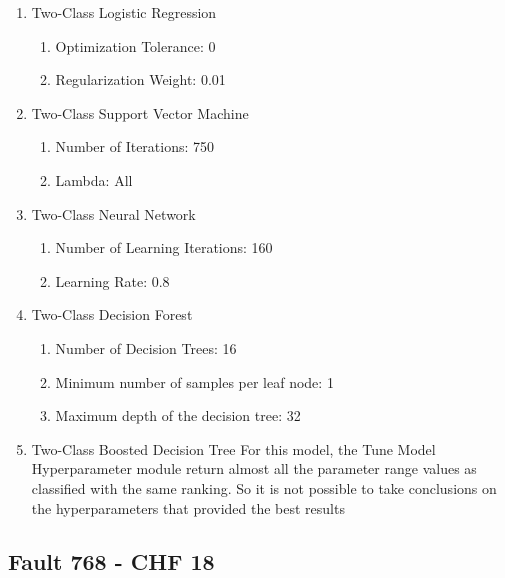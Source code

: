 \begin{enumerate}
    \item{Two-Class Logistic Regression}
    
    \begin{enumerate}
        \item{Optimization Tolerance:} 0
        \item{Regularization Weight:} 0.01
    \end{enumerate}
    
    \item{Two-Class Support Vector Machine}
    
    \begin{enumerate}
        \item{Number of Iterations:} 750
        \item{Lambda:} All
    \end{enumerate}
    
    \item{Two-Class Neural Network}
    
    \begin{enumerate}
        \item{Number of Learning Iterations:} 160
        \item{Learning Rate:} 0.8
    \end{enumerate}
    
    \item{Two-Class Decision Forest}

    \begin{enumerate}
        \item{Number of Decision Trees:} 16
        \item{Minimum number of samples per leaf node:} 1
        \item{Maximum depth of the decision tree:} 32
    \end{enumerate}
    
    \item{Two-Class Boosted Decision Tree}
    For this model, the Tune Model Hyperparameter module return almost all the parameter range values as classified with the same ranking. So it is not possible to take conclusions on the hyperparameters that provided the best results
    
\end{enumerate}


\subsection{Fault 768 - CHF 18}

